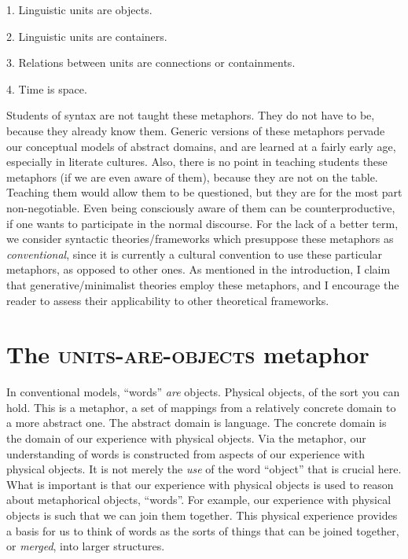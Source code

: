 1. Linguistic units are objects.

2. Linguistic units are containers.

3. Relations between units are connections or containments.

4. Time is space.

  Students of syntax are not taught these metaphors. They do not have to be, because they already know them. Generic versions of these metaphors pervade our conceptual models of abstract domains, and are learned at a fairly early age, especially in literate cultures. Also, there is no point in teaching students these metaphors (if we are even aware of them), because they are not on the table. Teaching them would allow them to be questioned, but they are for the most part non-negotiable. Even being consciously aware of them can be counterproductive, if one wants to participate in the normal discourse. For the lack of a better term, we consider syntactic theories/frameworks which presuppose these metaphors as \textit{conventional}, since it is currently a cultural convention to use these particular metaphors, as opposed to other ones. As mentioned in the introduction, I claim that generative/minimalist theories employ these metaphors, and I encourage the reader to assess their applicability to other theoretical frameworks.

\section{{The} {\textsc{units-}}{\textsc{are}}{\textsc{{}-objects}}{ metaphor}} 

In conventional models, “words” \textit{are} objects. Physical objects, of the sort you can hold. This is a metaphor, a set of mappings from a relatively concrete domain to a more abstract one. The abstract domain is language. The concrete domain is the domain of our experience with physical objects. Via the metaphor, our understanding of words is constructed from aspects of our experience with physical objects. It is not merely the \textit{use} of the word “object” that is crucial here. What is important is that our experience with physical objects is used to reason about metaphorical objects, “words”. For example, our experience with physical objects is such that we can join them together. This physical experience provides a basis for us to think of words as the sorts of things that can be joined together, or \textit{merged}, into larger structures.


